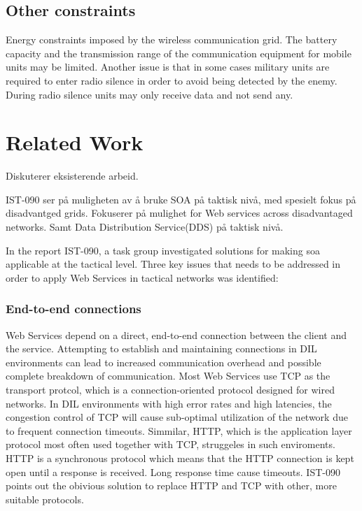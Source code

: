 \documentclass[USenglish]{ifimaster}
\begin{document}
\subsection{Other constraints}
Energy constraints imposed by the wireless communication grid. The battery
capacity and the transmission range of the communication equipment for mobile
units may be limited. Another issue is that in some cases military units are
required to enter radio silence in order to avoid being detected by the enemy.
During radio silence units may only receive data and not send any.


\section{Related Work}
Diskuterer eksisterende arbeid.

IST-090 ser på muligheten av å bruke SOA på taktisk nivå, med spesielt fokus på
disadvantged grids. Fokuserer på mulighet for Web services across disadvantaged
networks. Samt Data Distribution Service(DDS) på taktisk nivå.

In the report IST-090, a task group investigated solutions for making \gls{soa}
applicable at the tactical level. Three key issues that needs to be addressed in
order to apply Web Services in tactical networks was
identified\cite{IST-118}\cite{IST-090}:

\label{section:DIL-problems}

\subsubsection{End-to-end connections}

Web Services depend on a direct, end-to-end connection between the client and
the service. Attempting to establish and maintaining connections in DIL
environments can lead to increased communication overhead and possible complete
breakdown of communication. Most Web Services use TCP as the transport protcol,
which is a connection-oriented protocol designed for wired networks. In DIL
environments with high error rates and high latencies, the congestion control of
TCP will cause sub-optimal utilization of the network due to frequent connection
timeouts. Simmilar, HTTP, which is the application layer protocol most often
used together with TCP, struggeles in such enviroments. HTTP is a synchronous
protocol which means that the HTTP connection is kept open until a response is
received. Long response time cause timeouts. IST-090 points out the obivious
solution to replace HTTP and TCP with other, more suitable protocols.
\end{document}
